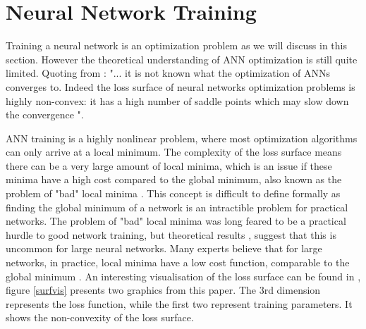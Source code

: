 \section{Neural Network Training}
Training a neural network is an optimization problem as we will discuss in this section. However the theoretical understanding of ANN optimization is still quite limited. Quoting from \cite{jacot2020neural}: "... it is not known what the optimization of ANNs converges to. Indeed the loss surface of neural networks optimization problems is highly non-convex: it has a high number of saddle points which may slow down the convergence \cite{DauphinYann2014Iaat}". 

ANN training is a highly nonlinear problem, where most optimization algorithms can only arrive at a local minimum. The complexity of the loss surface means there can be a very large amount of local minima, which is an issue if these minima have a high cost compared to the global minimum, also known as the problem of "bad" local minima \cite{Goodfellow-et-al-2016}. This concept is difficult to define formally as finding the global minimum of a network is an intractible problem for practical networks. The problem of "bad" local minima was long feared to be a practical hurdle to good network training, but theoretical results \cite{ChoromanskaAnna2015Tlso},\cite{SaxeAndrewM2013Estt} suggest that this is uncommon for large neural networks. Many experts believe that for large networks, in practice, local minima have a low cost function, comparable to the global minimum \cite{Goodfellow-et-al-2016}. An interesting visualisation of the loss surface can be found in \cite{li2018visualizing}, figure \ref{surfvis} presents two graphics from this paper. The 3rd dimension represents the loss function, while the first two represent training parameters. It shows the non-convexity of the loss surface.

